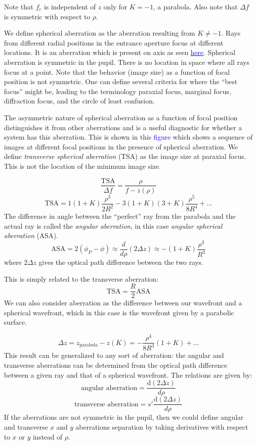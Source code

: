 \documentclass[12pt]{article}
\begin{document}
Note that $f_e$ is independent of $z$ only for $K=-1$, a parabola.
Also note that $\Delta f$ is symmetric with respect to $\rho$.

We define spherical aberration as the aberration resulting from
$K\ne -1$. Rays from different radial positions in the entrance
aperture focus at different locations. It is an aberration which is
present on axis as seen
\href{http://astronomy.nmsu.edu/holtz/a535/html/diagrams/a535/spher.htm}
{\textcolor{blue}{here}}. Spherical aberration is symmetric in
the pupil. There is no location in space where all rays focus at a
point. Note that the behavior (image size) as a function of focal
position is not symmetric. One can define several criteria for where
the ``best focus'' might be, leading to the terminology paraxial
focus, marginal focus, diffraction focus, and the circle of least
confusion.

The asymmetric nature of spherical aberration as a function of focal
position distinguishes it from other aberrations and is a useful
diagnostic for whether a system has this aberration. This is shown in this
\textcolor{blue}{figure} which shows a sequence of images at different focal
positions in the presence of spherical aberration. We define
\emph{transverse spherical aberration} (TSA) as the image size at paraxial
focus. This is not the location of the minimum image size.

$$ \frac{\textrm{TSA}}{\Delta f} = \frac{\rho}{f-z(\rho)} $$
$$ \textrm{TSA} = 1(1+K)\frac{\rho^3}{2R^2} -
    3(1+K)(3+K)\frac{\rho^5}{8R^4} + \ldots $$
The difference in angle between the ``perfect'' ray from the parabola
and the actual ray is called the \emph{angular aberration}, in this case
\emph{angular spherical aberration} (ASA).
$$ \textrm{ASA} = 2(\phi_{P}-\phi) \approx \frac{d}{d\rho}(2\Delta z)
    \approx -(1+K)\frac{\rho^3}{R^3} $$
where $2\Delta z$ gives the optical path difference between the two rays.

This is simply related to the transverse aberration:
$$ \textrm{TSA} = \frac{R}{2}\textrm{ASA} $$
We can also consider aberration as the difference between our
wavefront and a spherical wavefront, which in this case is the
wavefront given by a parabolic surface.

$$ \Delta z = z_{\textrm{parabola}}-z(K) = -\frac{\rho^4}{8R^3}(1+K)+\ldots $$
This result can be generalized to any sort of aberration: the angular
and transverse aberrations can be determined from the optical path
difference between a given ray and that of a spherical wavefront. The
relations are given by:
$$ \textrm{angular aberration} = \frac{\textrm{d}(2\Delta z)}{d\rho} $$
$$ \textrm{transverse aberration} = s'\frac{\textrm{d}(2\Delta z)}{d\rho} $$
If the aberrations are not symmetric in the pupil, then we could
define angular and transverse $x$ and $y$ aberrations separation by taking
derivatives with respect to $x$ or $y$ instead of $\rho$.
\end{document}
